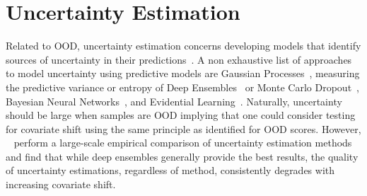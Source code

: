\section{Uncertainty Estimation}\label{sec:uncertainty-estimation}
Related to OOD, uncertainty estimation concerns developing models that identify sources of uncertainty in their predictions~\citep{ensemble, trustuncert}.
A non exhaustive list of approaches to model uncertainty using predictive models are Gaussian Processes~\citep{williams1995gaussian}, measuring the
predictive variance or entropy of Deep Ensembles~\citep{ensemble} or Monte Carlo Dropout~\citep{dropout}, Bayesian Neural Networks~\citep{baysneural}, and Evidential Learning~\citep{evidential, evclass}.
Naturally, uncertainty should be large when samples are OOD implying that one could consider testing for covariate shift using the same principle as identified for OOD scores.
However, ~\citep{trustuncert} perform a large-scale empirical comparison of uncertainty estimation methods and find that while deep ensembles generally provide the best results, the quality of uncertainty estimations, regardless of method, consistently degrades with increasing covariate shift.


